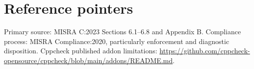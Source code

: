 \documentclass[10pt,letterpaper]{article}
\begin{document}
\section{Reference pointers}
Primary source: MISRA C:2023 Sections 6.1--6.8 and Appendix B. Compliance process: MISRA Compliance:2020, particularly enforcement and diagnostic disposition. Cppcheck published addon limitations: \url{https://github.com/cppcheck-opensource/cppcheck/blob/main/addons/README.md}.
\end{document}
